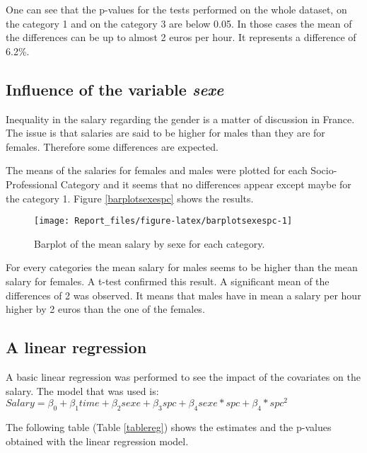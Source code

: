 \documentclass[]{article}
\begin{document}
One can see that the p-values for the tests performed on the whole
dataset, on the category 1 and on the category 3 are below 0.05. In
those cases the mean of the differences can be up to almost 2 euros per
hour. It represents a difference of 6.2\%.

\subsection{Influence of the variable
\emph{sexe}}\label{influence-of-the-variable-sexe}

Inequality in the salary regarding the gender is a matter of discussion
in France. The issue is that salaries are said to be higher for males
than they are for females. Therefore some differences are expected.

The means of the salaries for females and males were plotted for each
Socio-Professional Category and it seems that no differences appear
except maybe for the category 1. Figure \ref{barplotsexespc} shows the
results.

\begin{figure}[H]

\texttt{[image: Report\_files/figure-latex/barplotsexespc-1]} \hfill{}

\caption{Barplot of the mean salary by sexe for each category. \label{barplotsexespc}}\label{fig:barplotsexespc}
\end{figure}

For every categories the mean salary for males seems to be higher than
the mean salary for females. A t-test confirmed this result. A
significant mean of the differences of 2 was observed. It means that
males have in mean a salary per hour higher by 2 euros than the one of
the females.

\newpage

\subsection{A linear regression}\label{a-linear-regression}

A basic linear regression was performed to see the impact of the
covariates on the salary. The model that was used is:
\(Salary = \beta_0 + \beta_1time + \beta_2sexe +\beta_3spc + \beta_4sexe*spc + \beta_4*spc^2\)

The following table (Table \ref{tablereg}) shows the estimates and the
p-values obtained with the linear regression model.
\end{document}
